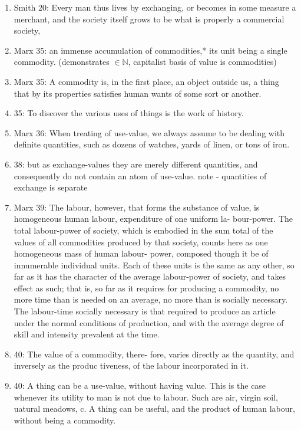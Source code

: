 \documentclass[12pt]{article}
\begin{document}
\begin{enumerate}
    \item Smith 20: Every man thus lives by exchanging, or becomes in some measure a merchant, and the society itself grows to be what is properly a commercial society,
    \item Marx 35: an immense accumulation of commodities,* its unit being a single commodity. (demonstrates $\in \mathbb{N}$, capitalist basis of value is commodities)
    \item Marx 35: A commodity is, in the first place, an object outside us, a thing that by its properties satisfies human wants of some sort or another.
	\item 35: To discover the various uses of things is the work of history.
    \item Marx 36: When treating of use-value, we always assume to be dealing with definite quantities, such as dozens of watches, yards of linen, or tons of iron.
	\item 38: but as exchange-values they are merely different quantities, and
		consequently do not contain an atom of use-value. note - quantities of exchange is separate
    \item Marx 39: The labour, however, that forms the substance of value,
is homogeneous human labour, expenditure of one uniform la-
bour-power. The total labour-power of society, which is embodied
in the sum total of the values of all commodities produced by that
society, counts here as one homogeneous mass of human labour-
power, composed though it be of innumerable individual units.
Each of these units is the same as any other, so far as it has the
character of the average labour-power of society, and takes effect as
such; that is, so far as it requires for producing a commodity, no
more time than is needed on an average, no more than is socially
necessary. The labour-time socially necessary is that required to
produce an article under the normal conditions of production, and
with the average degree of skill and intensity prevalent at the time.
	\item 40: The value of a commodity, there-
fore, varies directly as the quantity, and inversely as the produc
tiveness, of the labour incorporated in it. 
	\item 40: A thing can be a use-value, without having value. This is
the case whenever its utility to man is not due to labour. Such
are air, virgin soil, uatural meadows, c. A thing can be useful,
and the product of human labour, without being a commodity.

\end{enumerate}
\end{document}
